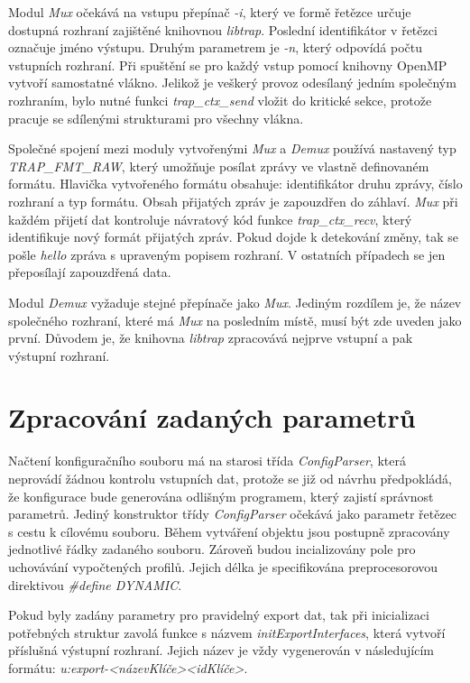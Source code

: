  Modul \textit{Mux} očekává na vstupu přepínač \textit{-i}, který ve formě řetězce určuje dostupná 
 rozhraní 
 zajištěné knihovnou \textit{libtrap}. Poslední identifikátor v řetězci označuje jméno 
 výstupu. Druhým parametrem je \textit{-n}, který odpovídá počtu vstupních rozhraní. Při spuštění 
 se pro každý vstup pomocí knihovny OpenMP vytvoří samostatné vlákno. Jelikož je veškerý provoz 
 odesílaný jedním společným rozhraním, bylo nutné funkci \textit{trap\_ctx\_send} vložit do
 kritické sekce, 
 protože pracuje se sdílenými strukturami pro všechny vlákna.
 
 Společné spojení mezi moduly vytvořenými \textit{Mux} a \textit{Demux} používá nastavený typ
 \textit{TRAP\_FMT\_RAW},
 který umožňuje posílat zprávy ve vlastně definovaném formátu. Hlavička vytvořeného formátu
 obsahuje: identifikátor druhu zprávy, číslo rozhraní a typ formátu. Obsah přijatých zpráv
 je zapouzdřen do záhlaví. \textit{Mux} při každém přijetí dat kontroluje návratový
 kód funkce \textit{trap\_ctx\_recv}, který identifikuje nový formát přijatých zpráv. Pokud
 dojde k detekování změny, tak se pošle \textit{hello} zpráva s upraveným popisem rozhraní.
 V ostatních případech se jen přeposílají zapouzdřená data.
 
 Modul \textit{Demux} vyžaduje stejné přepínače jako \textit{Mux}. Jediným rozdílem je, že 
 název společného rozhraní, které má \textit{Mux} na posledním místě, musí být zde uveden 
 jako první. Důvodem je, že knihovna \textit{libtrap} zpracovává nejprve vstupní a pak
 výstupní rozhraní. 
 
\section{Zpracování zadaných parametrů}

Načtení konfiguračního souboru má na starosi třída \textit{ConfigParser}, která neprovádí 
žádnou kontrolu vstupních dat, protože se již od návrhu předpokládá, že konfigurace bude 
generována odlišným programem, který zajistí správnost parametrů. Jediný konstruktor třídy
 \textit{ConfigParser} očekává jako parametr řetězec s cestu k cílovému souboru. Během vytváření
 objektu jsou postupně zpracovány jednotlivé řádky zadaného souboru. Zároveň budou incializovány
 pole pro uchovávání vypočtených profilů. Jejich délka je specifikována preprocesorovou direktivou
 \textit{\#define DYNAMIC}.
 
Pokud byly zadány parametry pro pravidelný export dat, tak při inicializaci potřebných struktur
zavolá funkce s názvem \textit{initExportInterfaces}, která vytvoří příslušná výstupní 
rozhraní. Jejich název je vždy vygenerován v následujícím formátu: 
\textit{u:export-<názevKlíče><idKlíče>}.
   
